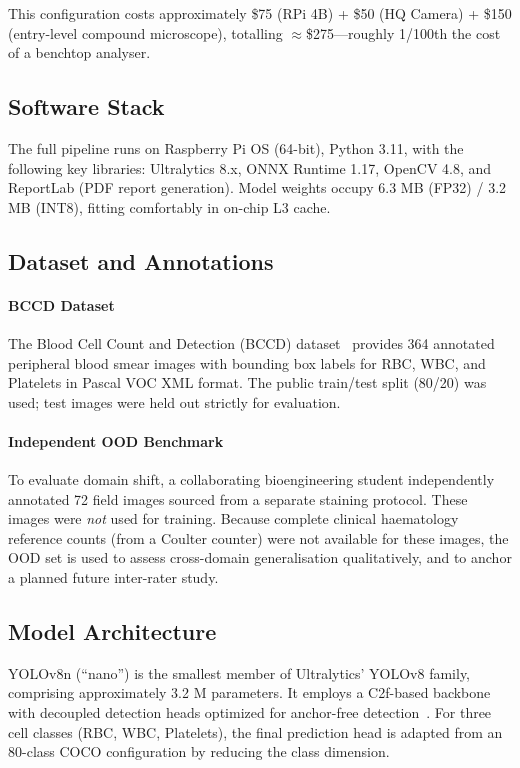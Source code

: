 \documentclass[10pt,conference]{IEEEtran}
\begin{document}
This configuration costs approximately \$75 (RPi 4B) + \$50 (HQ Camera) + \$150 (entry-level compound microscope), totalling $\approx$\$275—roughly 1/100th the cost of a benchtop analyser.

\subsection{Software Stack}
The full pipeline runs on Raspberry Pi OS (64-bit), Python 3.11, with the following key libraries: Ultralytics 8.x, ONNX Runtime 1.17, OpenCV 4.8, and ReportLab (PDF report generation). Model weights occupy 6.3 MB (FP32) / 3.2 MB (INT8), fitting comfortably in on-chip L3 cache.

\subsection{Dataset and Annotations}
\paragraph{BCCD Dataset} The Blood Cell Count and Detection (BCCD) dataset~\cite{bccd} provides 364 annotated peripheral blood smear images with bounding box labels for RBC, WBC, and Platelets in Pascal VOC XML format. The public train/test split (80/20) was used; test images were held out strictly for evaluation.

\paragraph{Independent OOD Benchmark} To evaluate domain shift, a collaborating bioengineering student independently annotated 72 field images sourced from a separate staining protocol. These images were \emph{not} used for training. Because complete clinical haematology reference counts (from a Coulter counter) were not available for these images, the OOD set is used to assess cross-domain generalisation qualitatively, and to anchor a planned future inter-rater study.

\subsection{Model Architecture}
YOLOv8n (``nano'') is the smallest member of Ultralytics' YOLOv8 family, comprising approximately 3.2 M parameters. It employs a C2f-based backbone with decoupled detection heads optimized for anchor-free detection~\cite{yolov8}. For three cell classes (RBC, WBC, Platelets), the final prediction head is adapted from an 80-class COCO configuration by reducing the class dimension.
\end{document}
